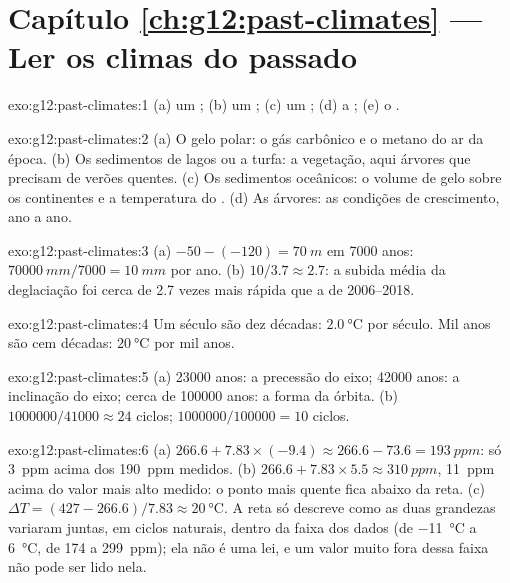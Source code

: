 \section*{Capítulo \ref{ch:g12:past-climates} --- Ler os climas do passado}

\begin{solution}{exo:g12:past-climates:1}
(a) um ; (b) um ; (c) um ;
(d) a ; (e) o .
\end{solution}

\begin{solution}{exo:g12:past-climates:2}
(a) O gelo polar: o gás carbônico e o metano do ar da época.
(b) Os sedimentos de lagos ou a turfa: a vegetação, aqui árvores que
precisam de verões quentes. (c) Os sedimentos oceânicos: o volume de gelo
sobre os continentes e a temperatura do . (d) As árvores: as
condições de crescimento, ano a ano.
\end{solution}

\begin{solution}{exo:g12:past-climates:3}
(a) $-50 - (-120) = \qty{70}{m}$ em \num{7000} anos: $\qty{70000}{mm}/\num{7000}
= \qty{10}{mm}$ por ano. (b) $10/3.7 \approx 2.7$: a subida média da
deglaciação foi cerca de 2.7 vezes mais rápida que a de 2006--2018.
\end{solution}

\begin{solution}{exo:g12:past-climates:4}
Um século são dez décadas: $\qty{2.0}{\degreeCelsius}$ por século. Mil anos
são cem décadas: $\qty{20}{\degreeCelsius}$ por mil anos.
\end{solution}

\begin{solution}{exo:g12:past-climates:5}
(a) \num{23000} anos: a precessão do eixo; \num{42000} anos: a inclinação
do eixo; cerca de \num{100000} anos: a forma da órbita.
(b) $\num{1000000}/\num{41000} \approx 24$ ciclos; $\num{1000000}/\num{100000}
= 10$ ciclos.
\end{solution}

\begin{solution}{exo:g12:past-climates:6}
(a) $266.6 + 7.83 \times (-9.4) \approx 266.6 - 73.6 = \qty{193}{ppm}$: só
\qty{3}{ppm} acima dos \qty{190}{ppm} medidos. (b) $266.6 + 7.83 \times 5.5
\approx \qty{310}{ppm}$, \qty{11}{ppm} acima do valor mais alto medido: o
ponto mais quente fica abaixo da reta. (c) $\Delta T = (427 - 266.6)/7.83 \approx
\qty{20}{\degreeCelsius}$. A reta só descreve como as duas grandezas
variaram juntas, em ciclos naturais, dentro da faixa dos dados
(de \qty{-11}{\degreeCelsius} a \qty{+6}{\degreeCelsius}, de 174 a
\qty{299}{ppm}); ela não é uma lei, e um valor muito fora dessa faixa não
pode ser lido nela.
\end{solution}


